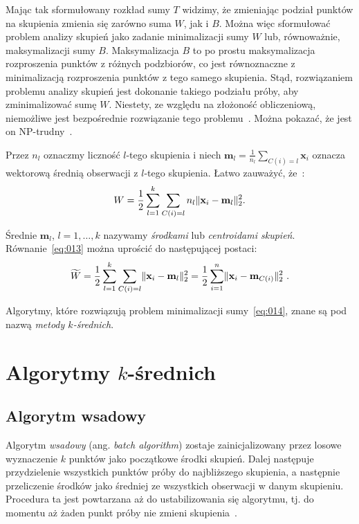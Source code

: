 \documentclass{praca1}
\DeclarePairedDelimiter{\norm}{\lVert}{\rVert}
\begin{document}
Mając tak sformułowany rozkład sumy $T$ widzimy, że zmieniając podział punktów na skupienia zmienia się zarówno suma $W$, jak i $B$. Można więc sformułować problem analizy skupień jako zadanie minimalizacji sumy $W$ lub, równoważnie, maksymalizacji sumy $B$. Maksymalizacja $B$ to po prostu maksymalizacja rozproszenia punktów z różnych podzbiorów, co jest równoznaczne z minimalizacją rozproszenia punktów z tego samego skupienia. Stąd, rozwiązaniem problemu analizy skupień jest dokonanie takiego podziału próby, aby zminimalizować sumę $W$. Niestety, ze względu na złożoność obliczeniową, niemożliwe jest bezpośrednie rozwiązanie tego problemu~\cite{Koronacki2005:statystyczne}. Można pokazać, że jest on NP-trudny~\cite{Aloise2009:np}.

Przez $n_l$ oznaczmy liczność $l$-tego skupienia i niech $\mathbf{m}_l = \frac{1}{n_l} \sum\limits_{C(i) = l} \mathbf{x}_i$ oznacza wektorową średnią obserwacji z $l$-tego skupienia. Łatwo zauważyć, że~\cite{Koronacki2005:statystyczne}:
\begin{equation}
\label{eq:013}
W = \frac{1}{2}\sum\limits_{l=1}^{k}\sum\limits_{C(i) = l} n_l \norm{\mathbf{x}_i - \mathbf{m}_l}_2^2.
\end{equation}

Średnie $\mathbf{m}_l$, $l = 1,\ldots, k$ nazywamy \emph{środkami} lub \emph{centroidami skupień}. Równanie~\eqref{eq:013} można uprościć do następującej postaci:
\begin{equation}
\label{eq:014}
\widetilde{W} = \frac{1}{2}\sum\limits_{l=1}^{k}\sum\limits_{C(i) = l} \norm{\mathbf{x}_i - \mathbf{m}_l}_2^2 = \frac{1}{2}\sum\limits_{i=1}^{n} \norm{\mathbf{x}_i - \mathbf{m}_{C(i)}}_2^2\ .
\end{equation}

Algorytmy, które rozwiązują problem minimalizacji sumy~\eqref{eq:014}, znane są pod nazwą \emph{metody $k$-średnich}.

\section{Algorytmy $k$-średnich}

\subsection{Algorytm wsadowy}


Algorytm \emph{wsadowy} (ang. \emph{batch algorithm}) zostaje zainicjalizowany przez losowe wyznaczenie $k$ punktów jako początkowe środki skupień. Dalej następuje przydzielenie wszystkich punktów próby do najbliższego skupienia, a następnie przeliczenie środków jako średniej ze wszystkich obserwacji w danym skupieniu. Procedura ta jest powtarzana aż do ustabilizowania się algorytmu, tj. do momentu aż żaden punkt próby nie zmieni skupienia~\cite{Wu2007:topten}.
\end{document}
